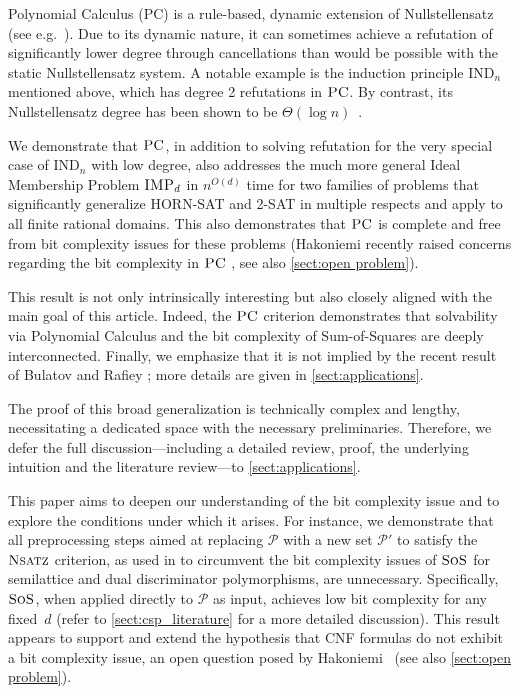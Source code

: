 \documentclass[11pt]{article}
\newcommand{\sos}{\text{\sc{SoS}}}
\newcommand{\IMP}{\textsc{IMP}}
\newcommand{\PC}{\textsc{PC}}
\newcommand{\Nsatz}{\textsc{Nsatz}}
\newcommand{\1}{\textbf{1}}
\begin{document}
Polynomial Calculus (\PC) is a rule-based, dynamic extension of Nullstellensatz (see e.g.~\cite{FlemingKothariPitassi19}). Due to its dynamic nature, it can sometimes achieve a refutation of significantly lower degree through cancellations than would be possible with the static Nullstellensatz system. A notable example is the induction principle \(\text{IND}_n\) mentioned above, which has degree 2 refutations in $\PC$. By contrast, its Nullstellensatz degree has been shown to be \(\Theta(\log n)\)~\cite{BussP98}.

    We demonstrate that $\PC$, in addition to solving refutation for the very special case of \(\text{IND}_n\) with low degree, also addresses the much more general Ideal Membership Problem $\IMP_d$ in $n^{O(d)}$ time for two families of problems that significantly generalize \textsc{HORN-SAT} and \textsc{2-SAT} in multiple respects and apply to all finite rational domains. This also demonstrates that \(\PC\) is complete and free from bit complexity issues for these problems (Hakoniemi recently raised concerns regarding the bit complexity in \(\PC\) \cite{Hakoniemi21}, see also \cref{sect:open problem}).  
    


    {This result is not only intrinsically interesting but also closely aligned with the main goal of this article. Indeed, the $\PC$ criterion demonstrates that solvability via Polynomial Calculus and the bit complexity of Sum-of-Squares are deeply interconnected.
    }
    Finally, we emphasize that it is not implied by the recent result of Bulatov and Rafiey \cite{BulatovRSTOC22}; more details are given in \cref{sect:applications}.

The proof of this broad generalization is technically complex and lengthy, necessitating a dedicated space with the necessary preliminaries. Therefore, we defer the full discussion—including a detailed review, proof, the underlying intuition and the literature review—to \cref{sect:applications}.


    




This paper aims to deepen our understanding of the bit complexity issue and to explore the conditions under which it arises. For instance, we demonstrate that all preprocessing steps aimed at replacing \(\mathcal{P}\) with a new set \(\mathcal{P'}\) to satisfy the \(\Nsatz\) criterion, as used in \cite{BulatovRSTOC22,Mastrolilli21TALG, BharathiM22, BharathiM21} to circumvent the bit complexity issues of \(\sos\) for semilattice and dual discriminator polymorphisms, are unnecessary. Specifically, \(\sos\), when applied directly to \(\mathcal{P}\) as input, achieves low bit complexity for any fixed~\(d\) (refer to \cref{sect:csp_literature} for a more detailed discussion). This result appears to support and extend the hypothesis that CNF formulas do not exhibit a bit complexity issue, an open question posed by Hakoniemi~\cite{Hakoniemi21} (see also \cref{sect:open problem}).
\end{document}
